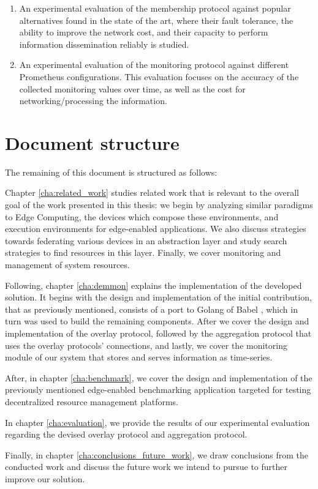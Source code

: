 \begin{enumerate}
    \item An experimental evaluation of the membership protocol against popular alternatives found in the state of the art, where their fault tolerance, the ability to improve the network cost, and their capacity to perform information dissemination reliably is studied. 

    \item An experimental evaluation of the monitoring protocol against different Prometheus \cite{prometheus} configurations. This evaluation focuses on the accuracy of the collected monitoring values over time, as well as the cost for networking/processing the information.
    
\end{enumerate}

\section{Document structure}

The remaining of this document is structured as follows: 

Chapter \ref{cha:related_work} studies related work that is relevant to the overall goal of the work presented in this thesis: we begin by analyzing similar paradigms to Edge Computing, the devices which compose these environments, and execution environments for edge-enabled applications. We also discuss strategies towards federating various devices in an abstraction layer and study search strategies to find resources in this layer. Finally, we cover monitoring and management of system resources.

Following, chapter \ref{cha:demmon} explains the implementation of the developed solution. It begins with the design and implementation of the initial contribution, that as previously mentioned, consists of a port to Golang of Babel \cite{babel}, which in turn was used to build the remaining components. After we cover the design and implementation of the overlay protocol, followed by the aggregation protocol that uses the overlay protocols' connections, and lastly, we cover the monitoring module of our system that stores and serves information as time-series.

After, in chapter \ref{cha:benchmark}, we cover the design and implementation of the previously mentioned edge-enabled benchmarking application targeted for testing decentralized resource management platforms.

In chapter \ref{cha:evaluation}, we provide the results of our experimental evaluation regarding the devised overlay protocol and aggregation protocol.

Finally, in chapter \ref{cha:conclusions_future_work}, we draw conclusions from the conducted work and discuss the future work we intend to pursue to further improve our solution.